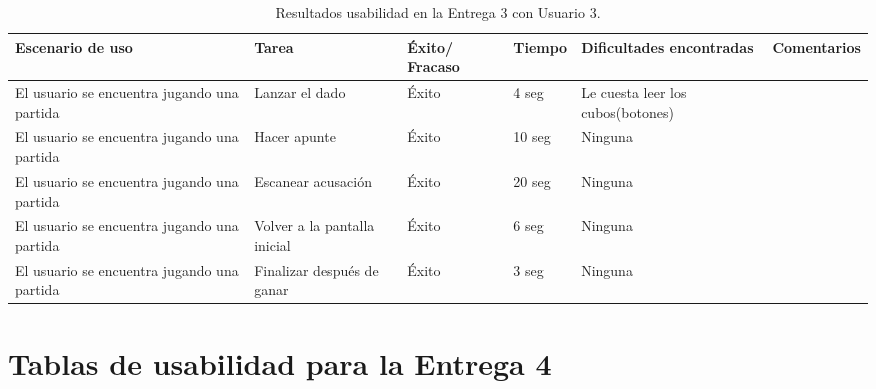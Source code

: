 \begin{table}[h]
  \begin{center}
    \begin{tabular}{|p{2.5cm}|p{1.75cm}|p{1.25cm}|p{1.25cm}|p{2.75cm}|p{3.5cm}|}

      \hline
        \rowcolor{Gray} \textbf{Escenario de uso}
        & \textbf{Tarea}
        & \textbf{Éxito/ Fracaso}
        & \textbf{Tiempo}
        & \textbf{Dificultades encontradas}
        & \textbf{Comentarios}\\

      \hline
      El usuario se encuentra jugando una partida
      & Lanzar el dado
      & Éxito
      & 4 seg
      & Le cuesta leer los cubos(botones)
      &\\

      \hline
      El usuario se encuentra jugando una partida
      & Hacer apunte
      & Éxito
      & 10 seg
      & Ninguna
      &\\

      \hline
      El usuario se encuentra jugando una partida
      & Escanear acusación
      & Éxito
      & 20 seg
      & Ninguna
      &\\

      \hline
      El usuario se encuentra jugando una partida
      & Volver a la pantalla inicial
      & Éxito
      & 6 seg
      & Ninguna
      &\\

      \hline
      El usuario se encuentra jugando una partida
      & Finalizar después de ganar
      & Éxito
      & 3 seg
      & Ninguna
      &\\

      \hline

    \end{tabular}

    \caption{Resultados usabilidad en la Entrega 3 con Usuario 3.}
    \label{tabla-entrega-3-usuario3}

  \end{center}
\end{table}

\FloatBarrier


\section{Tablas de usabilidad para la Entrega 4} \label{tablas-usabilidad-entrega-4}

